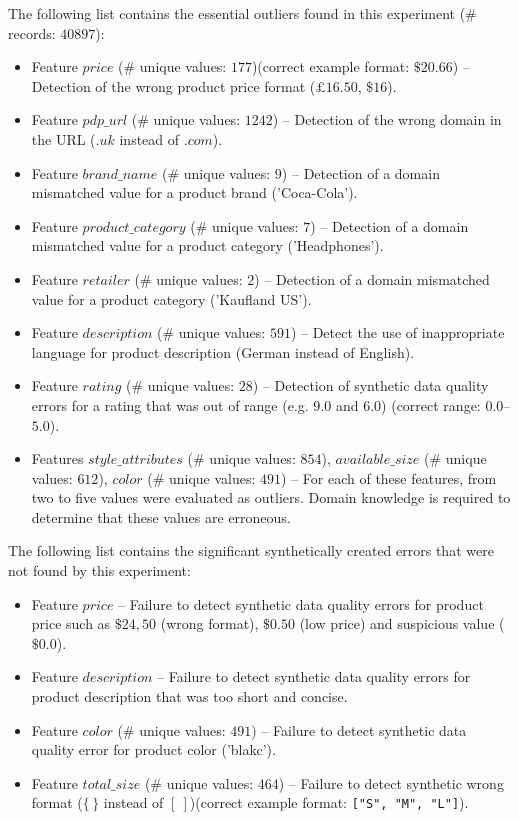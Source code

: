 					The following list contains the essential outliers found in this experiment (\# records: $40897$):
					
					\begin{itemize}
						\item Feature $price$ (\# unique values: $177$)(correct example format: $\$20.66$) -- Detection of the wrong product price format ($£16.50$, $\$16$).
						\item Feature $pdp\_url$ (\# unique values: $1242$) -- Detection of the wrong domain in the URL ($.uk$ instead of $.com$). 
						\item Feature $brand\_name$ (\# unique values: $9$) -- Detection of a domain mismatched value for a product brand ('Coca-Cola').  
						\item Feature $product\_category$ (\# unique values: $7$) -- Detection of a domain mismatched value for a product category ('Headphones').
						\item Feature $retailer$ (\# unique values: $2$) -- Detection of a domain mismatched value for a product category ('Kaufland US').
						\item Feature $description$ (\# unique values: $591$) -- Detect the use of inappropriate language for product description (German instead of English).
						\item Feature $rating$ (\# unique values: $28$) -- Detection of synthetic data quality errors for a rating that was out of range (e.g. $9.0$ and $6.0$) (correct range: $0.0$--$5.0$).
						\item Features $style\_attributes$ (\# unique values: $854$), $available\_size$ (\# unique values: $612$), $color$ (\# unique values: $491$) -- For each of these features, from two to five values were evaluated as outliers. Domain knowledge is required to determine that these values are erroneous.
					\end{itemize}
					
					The following list contains the significant synthetically created errors that were not found by this experiment:
					
					\begin{itemize}
						\item Feature $price$ -- Failure to detect synthetic data quality errors for product price such as $\$24,50$ (wrong format), $\$0.50$ (low price) and suspicious value ($\$0.0$).
						\item Feature $description$ -- Failure to detect synthetic data quality errors for product description that was too short and concise. 
						\item Feature $color$ (\# unique values: $491$) -- Failure to detect synthetic data quality error for product color ('blakc').
						\item Feature $total\_size$ (\# unique values: $464$) -- Failure to detect synthetic wrong format ($\{\,\}$ instead of $[\:]$)(correct example format: \texttt{["S", "M", "L"]}).
					\end{itemize}
					
